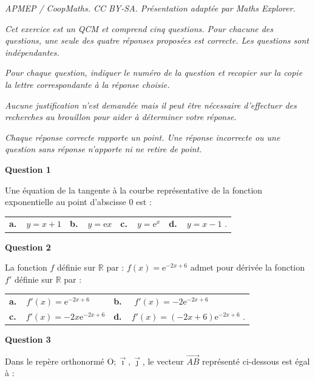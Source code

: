 \documentclass[10pt]{article}
\providecommand{\vv}[1]{\overrightarrow{#1}}
\providecommand{\R}{\mathbb{R}}
\providecommand{\e}{{\mathrm{e}}}
\providecommand{\vv}[1]{{\overrightarrow{#1}}}
\providecommand{\Oij}{\(\mathrm{O};\vec{\imath},\vec{\jmath}\)}
\begin{document}
\noindent\textit{APMEP / CoopMaths. CC BY-SA. Présentation adaptée par Maths Explorer.}\par\medskip
\medskip

\emph{Cet exercice est un QCM et comprend cinq questions. Pour chacune des questions, une seule
des quatre réponses proposées est correcte. Les questions sont indépendantes.}

\emph{Pour chaque question, indiquer le numéro de la question et recopier sur la copie la lettre
correspondante à la réponse choisie.}

\emph{Aucune justification n'est demandée mais il peut être nécessaire d'effectuer des recherches
au brouillon pour aider à déterminer votre réponse.}

\emph{Chaque réponse correcte rapporte un point. Une réponse incorrecte ou une question sans
réponse n'apporte ni ne retire de point.}

\medskip

\textbf{Question 1}

\medskip

Une équation de la tangente à la courbe représentative de la fonction exponentielle au point
d'abscisse 0 est :

\begin{tabularx}{\linewidth}{*{4}{X}}
\textbf{a.~~}$y=x+1$  &\textbf{b.~~}$y=\e x$ &\textbf{c.~~$y=\e^x $}& \textbf{d.~~}$y= x-1 $ .
\end{tabularx}

\smallskip

\textbf{Question 2}

\medskip

La fonction $f$ définie sur $\R$ par : $f(x) = \e^{-2x+6}$ admet pour dérivée la fonction $f'$ définie
sur $\R$ par :
\begin{tabularx}{\linewidth}{*{2}{X}}
\textbf{a.~~}$f'(x) = \e^{-2x+6}$  &\textbf{b.~~} $f'(x) = -2\e^{-2x+6}$\\\textbf{c.~~}$f'(x) = -2x\e^{-2x+6}$& \textbf{d.~~}$f'(x) = (-2x + 6)\e^{-2x+6}$ .
\end{tabularx}

\medskip

\textbf{Question 3}

\medskip
Dans le repère orthonormé \Oij, le vecteur $\vv{AB}$ représenté ci-dessous est égal à :
\end{document}
